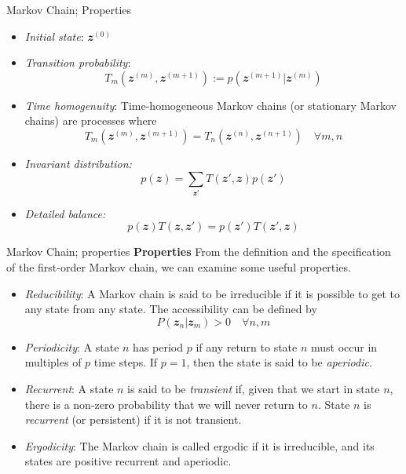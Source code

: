 \documentclass{bredelebeamer}
\begin{document}
\begin{frame}{Markov Chain; Properties}
  \begin{itemize}
    \item \textit{Initial state}: $\mathbfit{z}^{(0)}$
    \item \textit{Transition probability}:
    \begin{equation}
      T_m(\mathbfit{z}^{(m)},\mathbfit{z}^{(m+1)})
      := p(\mathbfit{z}^{(m+1)}|\mathbfit{z}^{(m)})
    \end{equation}
    \item \textit{Time homogenuity}:
    Time-homogeneous Markov chains (or stationary Markov chains) are processes
    where
    \begin{equation}
      T_m(\mathbfit{z}^{(m)},\mathbfit{z}^{(m+1)})
      = T_n(\mathbfit{z}^{(n)},\mathbfit{z}^{(n+1)})
      \quad \forall m, n
    \end{equation}
    \item \textit{Invariant distribution:}
    \begin{equation}
      p(\mathbfit{z}) = \sum_{\mathbfit{z}'} T(\mathbfit{z}',\mathbfit{z}) p(\mathbfit{z}')
    \end{equation}
    \item \textit{Detailed balance:}
    \begin{equation}
      p(\mathbfit{z}) T(\mathbfit{z},\mathbfit{z}')
      = p(\mathbfit{z}') T(\mathbfit{z}',\mathbfit{z})
    \end{equation}
  \end{itemize}
\end{frame}

\begin{frame}{Markov Chain; properties}
  \textbf{Properties}
  From the definition and the specification of the first-order Markov chain,
  we can examine some useful properties.
  \begin{itemize}
    \item \textit{Reducibility}:
    A Markov chain is said to be irreducible if it is possible to get
    to any state from any state. The accessibility can be defined by
    \begin{equation}
      P(\mathbfit{z}_{n} | \mathbfit{z}_{m}) > 0 \quad \forall n, m
    \end{equation}
    \item \textit{Periodicity}:
    A state $n$ has period $p$ if any return to state $n$ must occur in
    multiples of $p$ time steps. If $p = 1$, then the state is said to
    be \textit{aperiodic}.
    \item \textit{Recurrent}:
    A state $n$ is said to be \textit{transient} if, given that we start
    in state $n$, there is a non-zero probability that we will never
    return to $n$. State $n$ is \textit{recurrent} (or persistent) if
    it is not transient.
    \item \textit{Ergodicity}:
    The Markov chain is called ergodic if it is irreducible, and its
    states are positive recurrent and aperiodic.
  \end{itemize}
\end{frame}
\end{document}
